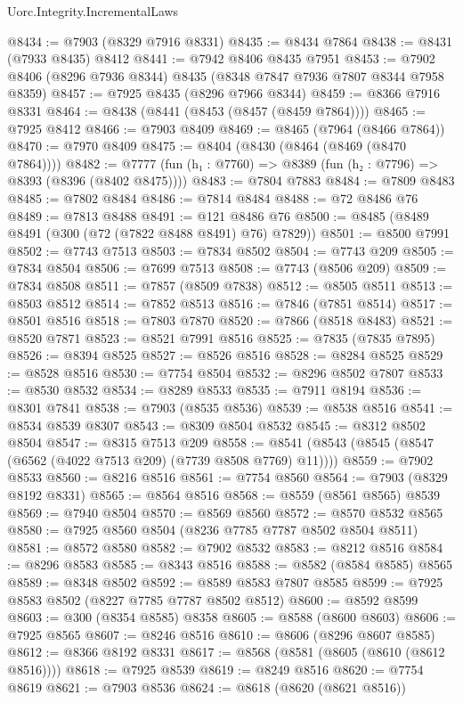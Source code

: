 \begin{lexlean}{Uorc.Integrity.IncrementalLaws}
\begin{coremodule}
@8434 := @7903 (@8329 @7916 @8331)
@8435 := @8434 @7864
@8438 := @8431 (@7933 @8435) @8412
@8441 := @7942 @8406 @8435 @7951
@8453 := @7902 @8406 (@8296 @7936 @8344) @8435 (@8348 @7847 @7936 @7807 @8344 @7958 @8359)
@8457 := @7925 @8435 (@8296 @7966 @8344)
@8459 := @8366 @7916 @8331
@8464 := @8438 (@8441 (@8453 (@8457 (@8459 @7864))))
@8465 := @7925 @8412
@8466 := @7903 @8409
@8469 := @8465 (@7964 (@8466 @7864))
@8470 := @7970 @8409
@8475 := @8404 (@8430 (@8464 (@8469 (@8470 @7864))))
@8482 := @7777 (fun (h₁ : @7760) => @8389 (fun (h₂ : @7796) => @8393 (@8396 (@8402 @8475))))
@8483 := @7804 @7883
@8484 := @7809 @8483
@8485 := @7802 @8484
@8486 := @7814 @8484
@8488 := @72 @8486 @76
@8489 := @7813 @8488
@8491 := @121 @8486 @76
@8500 := @8485 (@8489 @8491 (@300 (@72 (@7822 @8488 @8491) @76) @7829))
@8501 := @8500 @7991
@8502 := @7743 @7513
@8503 := @7834 @8502
@8504 := @7743 @209
@8505 := @7834 @8504
@8506 := @7699 @7513
@8508 := @7743 (@8506 @209)
@8509 := @7834 @8508
@8511 := @7857 (@8509 @7838)
@8512 := @8505 @8511
@8513 := @8503 @8512
@8514 := @7852 @8513
@8516 := @7846 (@7851 @8514)
@8517 := @8501 @8516
@8518 := @7803 @7870
@8520 := @7866 (@8518 @8483)
@8521 := @8520 @7871
@8523 := @8521 @7991 @8516
@8525 := @7835 (@7835 @7895)
@8526 := @8394 @8525
@8527 := @8526 @8516
@8528 := @8284 @8525
@8529 := @8528 @8516
@8530 := @7754 @8504
@8532 := @8296 @8502 @7807
@8533 := @8530 @8532
@8534 := @8289 @8533
@8535 := @7911 @8194
@8536 := @8301 @7841
@8538 := @7903 (@8535 @8536)
@8539 := @8538 @8516
@8541 := @8534 @8539 @8307
@8543 := @8309 @8504 @8532
@8545 := @8312 @8502 @8504
@8547 := @8315 @7513 @209
@8558 := @8541 (@8543 (@8545 (@8547 (@6562 (@4022 @7513 @209) (@7739 @8508 @7769) @11))))
@8559 := @7902 @8533
@8560 := @8216 @8516
@8561 := @7754 @8560
@8564 := @7903 (@8329 @8192 @8331)
@8565 := @8564 @8516
@8568 := @8559 (@8561 @8565) @8539
@8569 := @7940 @8504
@8570 := @8569 @8560
@8572 := @8570 @8532 @8565
@8580 := @7925 @8560 @8504 (@8236 @7785 @7787 @8502 @8504 @8511)
@8581 := @8572 @8580
@8582 := @7902 @8532
@8583 := @8212 @8516
@8584 := @8296 @8583
@8585 := @8343 @8516
@8588 := @8582 (@8584 @8585) @8565
@8589 := @8348 @8502
@8592 := @8589 @8583 @7807 @8585
@8599 := @7925 @8583 @8502 (@8227 @7785 @7787 @8502 @8512)
@8600 := @8592 @8599
@8603 := @300 (@8354 @8585) @8358
@8605 := @8588 (@8600 @8603)
@8606 := @7925 @8565
@8607 := @8246 @8516
@8610 := @8606 (@8296 @8607 @8585)
@8612 := @8366 @8192 @8331
@8617 := @8568 (@8581 (@8605 (@8610 (@8612 @8516))))
@8618 := @7925 @8539
@8619 := @8249 @8516
@8620 := @7754 @8619
@8621 := @7903 @8536
@8624 := @8618 (@8620 (@8621 @8516))

\end{coremodule}
\end{lexlean}
